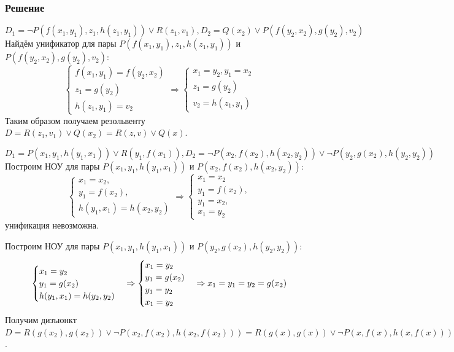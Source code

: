 \documentclass[11pt]{article}
\begin{document}
\subsubsection{Решение}
\label{sec:org3e2d918}
$$D_1 = \lnot P(f(x_1, y_1), z_1, h(z_1, y_1)) \lor R(z_1, v_1), D_2 = Q(x_2) \lor P(f(y_2, x_2), g(y_2), v_2)$$
Найдём унификатор для пары \(P(f(x_1, y_1), z_1, h(z_1, y_1))\) и \(P(f(y_2, x_2), g(y_2), v_2)\):
\begin{equation*}
\begin{cases}
f(x_1, y_1) = f(y_2, x_2) \\
z_1 = g(y_2) \\
h(z_1, y_1) = v_2
\end{cases}
\Rightarrow
\begin{cases}
x_1 = y_2, y_1 = x_2 \\
z_1 = g(y_2) \\
v_2 = h(z_1, y_1)
\end{cases}
\end{equation*}
Таким образом получаем резольвенту \(D = R(z_1, v_1) \lor Q(x_2) = R(z, v) \lor Q(x)\).

$$D_1 = P(x_1, y_1, h(y_1, x_1)) \lor R(y_1, f(x_1)), D_2 = \lnot P(x_2, f(x_2), h(x_2, y_2)) \lor \lnot P(y_2, g(x_2), h(y_2, y_2))$$
Построим НОУ для пары \(P(x_1, y_1, h(y_1, x_1))\) и \(P(x_2, f(x_2), h(x_2, y_2))\):
\begin{equation*}
\begin{cases}
x_1 = x_2, \\
y_1 = f(x_2), \\
h(y_1, x_1) = h(x_2, y_2)
\end{cases}
\Rightarrow
\begin{cases}
x_1 = x_2 \\
y_1 = f(x_2), \\
y_1 = x_2, \\
x_1 = y_2
\end{cases}
\end{equation*}
унификация невозможна.

Построим НОУ для пары $P(x_1, y_1, h(y_1, x_1))$ и $P(y_2, g(x_2), h(y_2, y_2))$:
\begin{equation*}
\begin{cases}
x_1 = y_2 \\
y_1 = g(x_2) \\
h(y_1, x_1) = h(y_2, y_2)
\end{cases}
\Rightarrow
\begin{cases}
x_1 = y_2 \\
y_1 = g(x_2) \\
y_1 = y_2 \\
x_1 = y_2
\end{cases}
\Rightarrow
x_1 = y_1 = y_2 = g(x_2) \\
\end{equation*}
Получим дизъюнкт \(D = R(g(x_2), g(x_2)) \lor \lnot P(x_2, f(x_2), h(x_2, f(x_2))) = R(g(x), g(x)) \lor \lnot P(x, f(x), h(x, f(x)))\).
\end{document}
